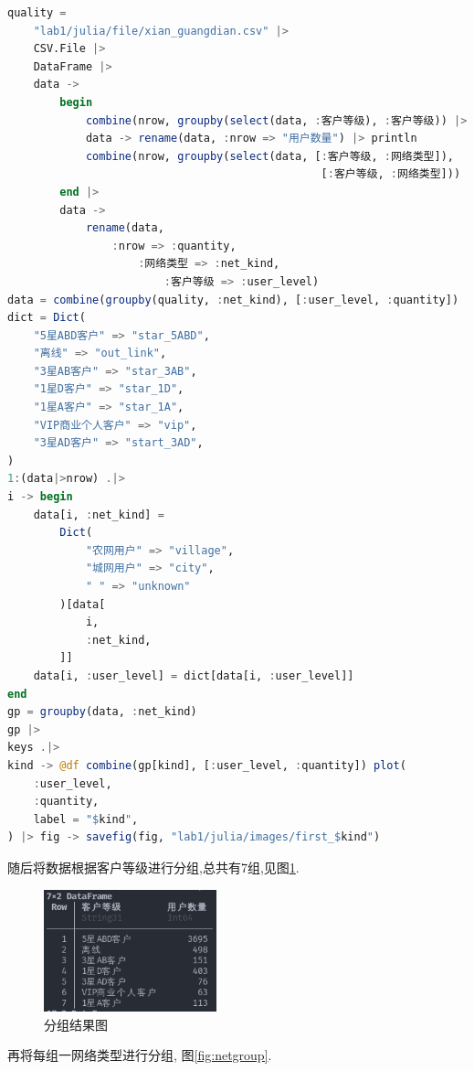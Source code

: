 \documentclass[a4paper]{article}
\begin{document}
\begin{lstlisting}[language=julia]
quality =
    "lab1/julia/file/xian_guangdian.csv" |>
    CSV.File |>
    DataFrame |>
    data ->
        begin
            combine(nrow, groupby(select(data, :客户等级), :客户等级)) |>
            data -> rename(data, :nrow => "用户数量") |> println
            combine(nrow, groupby(select(data, [:客户等级, :网络类型]), 
                                                [:客户等级, :网络类型]))
        end |>
        data ->
            rename(data, 
                :nrow => :quantity, 
                    :网络类型 => :net_kind, 
                        :客户等级 => :user_level)
data = combine(groupby(quality, :net_kind), [:user_level, :quantity])
dict = Dict(
    "5星ABD客户" => "star_5ABD",
    "离线" => "out_link",
    "3星AB客户" => "star_3AB",
    "1星D客户" => "star_1D",
    "1星A客户" => "star_1A",
    "VIP商业个人客户" => "vip",
    "3星AD客户" => "start_3AD",
)
1:(data|>nrow) .|>
i -> begin
    data[i, :net_kind] =
        Dict(
            "农网用户" => "village", 
            "城网用户" => "city",
            " " => "unknown"
        )[data[
            i,
            :net_kind,
        ]]
    data[i, :user_level] = dict[data[i, :user_level]]
end
gp = groupby(data, :net_kind)
gp |>
keys .|>
kind -> @df combine(gp[kind], [:user_level, :quantity]) plot(
    :user_level,
    :quantity,
    label = "$kind",
) |> fig -> savefig(fig, "lab1/julia/images/first_$kind")
\end{lstlisting}

随后将数据根据客户等级进行分组,总共有7组,见图\ref{fig:customgroup}. 
\begin{figure}[ht]
 \centering
 \includegraphics[width=5cm]{images/广电客户.png}
 \caption{分组结果图}
 \label{fig:customgroup}
\end{figure}

再将每组一网络类型进行分组, 图\ref{fig:netgroup}. 
\end{document}
